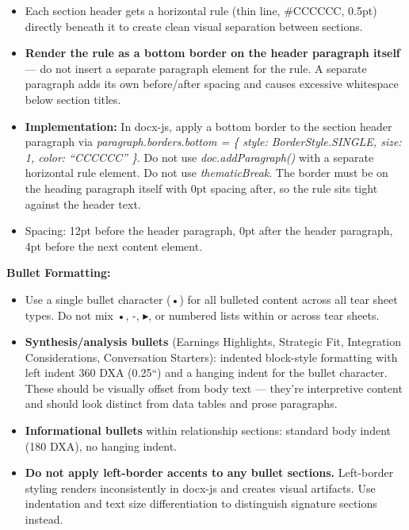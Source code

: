 \documentclass[11pt]{article}
\begin{document}
\begin{itemize}[leftmargin=*,itemsep=2pt,topsep=2pt]
\item {} Each section header gets a horizontal rule (thin line, \#CCCCCC, 0.5pt) directly beneath it to create clean visual separation between sections.
\item {} \textbf{Render the rule as a bottom border on the header paragraph itself} — do not insert a separate paragraph element for the rule. A separate paragraph adds its own before/after spacing and causes excessive whitespace below section titles.
\item {} \textbf{Implementation:} In docx-js, apply a bottom border to the section header paragraph via \emph{paragraph.borders.bottom = \{ style: BorderStyle.SINGLE, size: 1, color: ``CCCCCC'' \}}. Do not use \emph{doc.addParagraph()} with a separate horizontal rule element. Do not use \emph{thematicBreak}. The border must be on the heading paragraph itself with 0pt spacing after, so the rule sits tight against the header text.
\item {} Spacing: 12pt before the header paragraph, 0pt after the header paragraph, 4pt before the next content element.
\end{itemize}

\textbf{Bullet Formatting:}

\begin{itemize}[leftmargin=*,itemsep=2pt,topsep=2pt]
\item {} Use a single bullet character (•) for all bulleted content across all tear sheet types. Do not mix •, -, ▸, or numbered lists within or across tear sheets.
\item {} \textbf{Synthesis/analysis bullets} (Earnings Highlights, Strategic Fit, Integration Considerations, Conversation Starters): indented block-style formatting with left indent 360 DXA (0.25``) and a hanging indent for the bullet character. These should be visually offset from body text — they're interpretive content and should look distinct from data tables and prose paragraphs.
\item {} \textbf{Informational bullets} within relationship sections: standard body indent (180 DXA), no hanging indent.
\item {} \textbf{Do not apply left-border accents to any bullet sections.} Left-border styling renders inconsistently in docx-js and creates visual artifacts. Use indentation and text size differentiation to distinguish signature sections instead.
\end{itemize}
\end{document}
